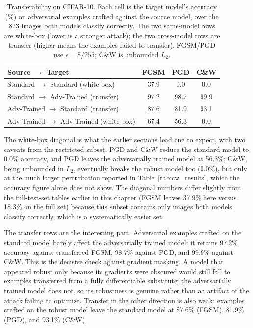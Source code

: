 \begin{table}[htbp]
    \centering
    \caption{Transferability on CIFAR-10. Each cell is the target model's accuracy (\%) on adversarial examples crafted against the source model, over the 823 images both models classify correctly. The two same-model rows are white-box (lower is a stronger attack); the two cross-model rows are transfer (higher means the examples failed to transfer). FGSM/PGD use $\epsilon = 8/255$; C\&W is unbounded $L_2$.}
    \label{tab:transfer_results}
    \begin{tabular}{lccc}
        \toprule
        \textbf{Source $\rightarrow$ Target} & \textbf{FGSM} & \textbf{PGD} & \textbf{C\&W} \\
        \midrule
        Standard $\rightarrow$ Standard (white-box) & 37.9 & 0.0 & 0.0 \\
        Standard $\rightarrow$ Adv-Trained (transfer) & 97.2 & 98.7 & 99.9 \\
        Adv-Trained $\rightarrow$ Standard (transfer) & 87.6 & 81.9 & 93.1 \\
        Adv-Trained $\rightarrow$ Adv-Trained (white-box) & 67.4 & 56.3 & 0.0 \\
        \bottomrule
    \end{tabular}
\end{table}

The white-box diagonal is what the earlier sections lead one to expect, with two caveats from the restricted subset. PGD and C\&W reduce the standard model to 0.0\% accuracy, and PGD leaves the adversarially trained model at 56.3\%; C\&W, being unbounded in $L_2$, eventually breaks the robust model too (0.0\%), but only at the much larger perturbation reported in Table~\ref{tab:cw_results}, which the accuracy figure alone does not show. The diagonal numbers differ slightly from the full-test-set tables earlier in this chapter (FGSM leaves 37.9\% here versus 18.3\% on the full set) because this subset contains only images both models classify correctly, which is a systematically easier set.

The transfer rows are the interesting part. Adversarial examples crafted on the standard model barely affect the adversarially trained model: it retains 97.2\% accuracy against transferred FGSM, 98.7\% against PGD, and 99.9\% against C\&W. This is the decisive check against gradient masking. A model that appeared robust only because its gradients were obscured would still fall to examples transferred from a fully differentiable substitute; the adversarially trained model does not, so its robustness is genuine rather than an artifact of the attack failing to optimize. Transfer in the other direction is also weak: examples crafted on the robust model leave the standard model at 87.6\% (FGSM), 81.9\% (PGD), and 93.1\% (C\&W).

